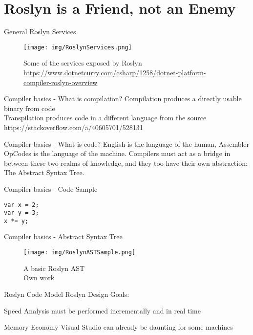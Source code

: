 \documentclass[10pt]{beamer}
\begin{document}
\section{Roslyn is a Friend, not an Enemy}
\begin{frame}{General Roslyn Services}
    \begin{figure}
        \center
        \texttt{[image: img/RoslynServices.png]}
        \caption{Some of the services exposed by Roslyn \\ \tiny{\href{Taken from DotNetCurry}{https://www.dotnetcurry.com/csharp/1258/dotnet-platform-compiler-roslyn-overview}}}
    \end{figure}
\end{frame}

\begin{frame}{Compiler basics - What is compilation?}
    Compilation produces a directly usable binary from code \\
    Transpilation produces code in a different language from the source \\
    \vspace{10pt}
    \tiny{https://stackoverflow.com/a/40605701/528131}
\end{frame}

\begin{frame}{Compiler basics - What is code?}
English is the language of the human, Assembler OpCodes is the language of the machine. Compilers must act as a bridge in between these two realms of knowledge, and they too have their own abstraction: The Abstract Syntax Tree.
\end{frame}

\begin{frame}[fragile]{Compiler basics - Code Sample}
\begin{verbatim}
var x = 2;
var y = 3;
x *= y;
\end{verbatim}
\end{frame}

\begin{frame}{Compiler basics - Abstract Syntax Tree}
    \begin{figure}
        \center
        \texttt{[image: img/RoslynASTSample.png]}
        \caption{A basic Roslyn AST \\ \tiny{Own work}}
    \end{figure}
\end{frame}

\begin{frame}{Roslyn Code Model}
Roslyn Design Goals:

\begin{block}{Speed}
    Analysis must be performed incrementally and in real time
\end{block}

\begin{block}{Memory Economy}
    Visual Studio can already be daunting for some machines
\end{block}
\end{frame}
\end{document}
